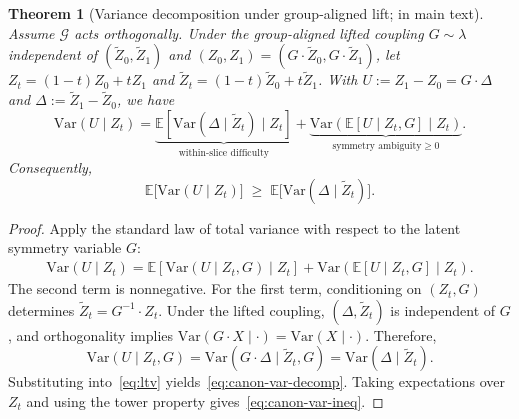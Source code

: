 \documentclass[10pt,a4paper]{amsart}
\newtheorem{theorem}{Theorem}
\begin{document}
\begin{theorem}[Variance decomposition under group-aligned lift;  in main text]
Assume $\mathcal{G}$ acts orthogonally. Under the group-aligned lifted coupling
$G\sim\lambda$ independent of $(\widetilde Z_0,\widetilde Z_1)$ and $(Z_0,Z_1)=(G\cdot\widetilde Z_0,G\cdot\widetilde Z_1)$,
let $Z_t=(1-t)Z_0+tZ_1$ and $\widetilde Z_t=(1-t)\widetilde Z_0+t\widetilde Z_1$.
With $U:=Z_1-Z_0=G\cdot\Delta$ and $\Delta:=\widetilde Z_1-\widetilde Z_0$, we have
\begin{equation}
\mathrm{Var}(U\mid Z_t)
=
\underbrace{\mathbb{E}\!\left[\mathrm{Var}(\Delta\mid \widetilde Z_t)\mid Z_t\right]}_{\text{within-slice difficulty}}
+
\underbrace{\mathrm{Var}\!\left(\mathbb{E}[U\mid Z_t,G]\mid Z_t\right)}_{\text{symmetry ambiguity}\ge 0}.
\end{equation}
Consequently,
\begin{equation}
\mathbb{E}\big[\mathrm{Var}(U\mid Z_t)\big]\;\ge\;\mathbb{E}\big[\mathrm{Var}(\Delta\mid \widetilde Z_t)\big].
\end{equation}
\end{theorem}

\begin{proof}
Apply the standard law of total variance with respect to the latent symmetry variable $G$:
\begin{equation}
\label{eq:ltv}
\begin{aligned}
\mathrm{Var}(U\mid Z_t)=
\mathbb{E}\!\left[\mathrm{Var}(U\mid Z_t,G)\mid Z_t\right]
+\mathrm{Var}\!\left(\mathbb{E}[U\mid Z_t,G]\mid Z_t\right).
\end{aligned}
\end{equation}
The second term is nonnegative. For the first term, conditioning on $(Z_t,G)$ determines $\widetilde Z_t = G^{-1}\cdot Z_t$. Under the lifted coupling, $(\Delta,\widetilde Z_t)$ is independent of $G$, and orthogonality implies $\mathrm{Var}(G\cdot X\mid \cdot)=\mathrm{Var}(X\mid \cdot)$. Therefore,
\begin{equation}
\mathrm{Var}(U\mid Z_t,G)=\mathrm{Var}(G\cdot\Delta\mid \widetilde Z_t,G)
=\mathrm{Var}(\Delta\mid \widetilde Z_t).
\end{equation}
Substituting into~\eqref{eq:ltv} yields~\eqref{eq:canon-var-decomp}. Taking expectations over $Z_t$ and using the tower property gives~\eqref{eq:canon-var-ineq}.
\end{proof}
\end{document}
